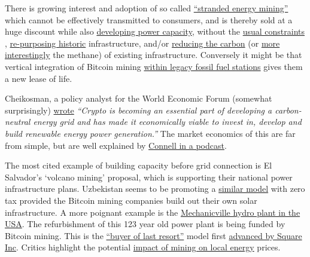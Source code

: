 There is growing interest and adoption of so called \href{https://www.bloomberg.com/news/articles/2022-06-01/oman-backs-u-s-firm-mining-crypto-to-cut-natural-gas-flaring}{``stranded energy mining''}  which cannot be effectively transmitted to consumers, and is thereby sold at a huge discount while also \href{https://www.renewableenergyworld.com/wind-power/900mw-wind-farm-to-power-bitcoin-mining-operation/}{developing power capacity}, without the \href{https://batcoinz.com/the-renewable-energy-cannot-happen-without-bitcoin-mining\%ef\%bf\%bc/}{usual constraints} \cite{bastian2021hedging}, \href{https://www.curbed.com/2021/07/crypto-currency-mining-old-power-plants.html}{re-purposing historic} infrastructure, and/or \href{https://www.bloomberg.com/news/articles/2022-03-24/exxon-considers-taking-gas-to-bitcoin-pilot-to-four-countries}{reducing the carbon} (or \href{https://batcoinz.com/quantifying-the-potential-impact-of-bitcoin-mining-on-global-methane-emissions-4/}{more interestingly} the methane) of existing infrastructure. Conversely it might be that vertical integration of Bitcoin mining \href{https://bitcoinmagazine.com/business/oil-companies-partner-with-bitcoin-miners}{within legacy fossil fuel stations} gives them a new lease of life.\par%
Cheikosman, a policy analyst for the World Economic Forum (somewhat surprisingly) \href{https://www.weforum.org/agenda/2022/03/crypto-energy-consumption/?}{wrote} \textit{``Crypto is becoming an essential part of developing a carbon-neutral energy grid and has made it economically viable to invest in, develop and build renewable energy power generation.''} 
The market economics of this are far from simple, but are well explained by \href{https://www.whatbitcoindid.com/podcast/bitcoin-energy-markets}{Connell in a podcast}.\par
The most cited example of building capacity before grid connection is El Salvador's `volcano mining' proposal, which is supporting their national power infrastructure plans. Uzbekistan seems to be promoting a \href{https://www.reuters.com/business/finance/uzbekistan-legalises-solar-powered-crypto-mining-2022-05-04/}{similar model} with zero tax provided the Bitcoin mining companies build out their own solar infrastructure. A more poignant example is the \href{https://www.timesunion.com/news/article/Mechanicville-hydro-plant-gets-new-life-16299115.php}{Mechanicville hydro plant in the USA}. The refurbishment of this 123 year old power plant is being funded by Bitcoin mining. This is the \href{https://www.lynalden.com/bitcoin-energy/}{``buyer of last resort''} model first \href{https://squareup.com/us/en/press/bcei-white-paper}{advanced by Square Inc}. Critics highlight the potential \href{https://www.fitchratings.com/research/us-public-finance/crypto-mining-poses-challenges-to-public-power-utilities-24-01-2022}{impact of mining on local energy} prices\cite{benetton2021cryptomining}.\par
